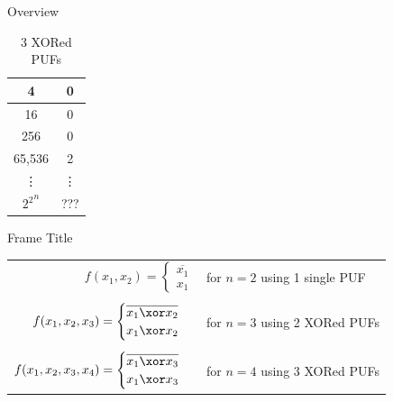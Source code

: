 \documentclass[10pt, compress]{beamer}
\begin{document}
\begin{frame}{Overview}
\begin{table}[H]
\begin{subtable}{0.23\textwidth}
\begin{tabular}{|c|c|}
            4         & 0         \\ \hline
            16        & 0         \\ \hline
            256       & 0         \\ \hline
            65,536    & 2         \\ \hline
            \vdots    & \vdots    \\ \hline
            ${2^2}^n$ & ???       \\ \hline
            \end{tabular}
            \caption{3 XORed PUFs}
        \end{subtable}
    \end{table}
\end{frame}


\begin{frame}{Frame Title}
    \begin{table}[H]
        \centering
        \begin{tabular}{r l}
             $f(x_1,x_2) =  \begin{cases} 
                                    \overline{x_1}\\ 
                                    x_1
                                \end{cases}$ &  for $n=2$ using 1 single PUF \\
                                &\\
             $f(x_1,x_2,x_3) =  \begin{cases} 
                                    \overline{x_1 \xor x_2}\\ 
                                    x_1 \xor x_2
                                \end{cases}$ & for $n = 3$ using 2 XORed PUFs \\
                                &\\
             $f(x_1,x_2,x_3,x_4) =  \begin{cases} 
                                    \overline{x_1 \xor x_3}\\ 
                                    x_1 \xor x_3
                                \end{cases}$ & for $n = 4$ using 3 XORed PUFs
                                
        \end{tabular}
    \end{table}  
\end{frame}
\end{document}
